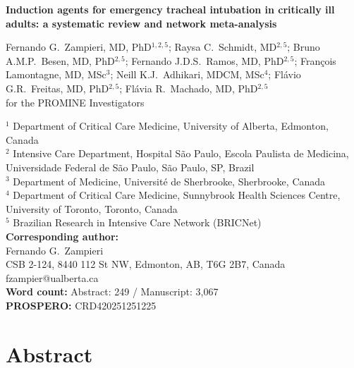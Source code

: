 \documentclass[11pt]{article}
\begin{document}
\begin{titlepage}
\centering
\vspace*{2cm}
{\LARGE\bfseries Induction agents for emergency tracheal intubation in critically ill adults: a systematic review and network meta-analysis\par}
\vspace{1.5cm}
{\large
Fernando G.\ Zampieri, MD, PhD$^{1,2,5}$;
Raysa C.\ Schmidt, MD$^{2,5}$;
Bruno A.M.P.\ Besen, MD, PhD$^{2,5}$;
Fernando J.D.S.\ Ramos, MD, PhD$^{2,5}$;
Fran\c{c}ois Lamontagne, MD, MSc$^{3}$;
Neill K.J.\ Adhikari, MDCM, MSc$^{4}$;
Fl\'avio G.R.\ Freitas, MD, PhD$^{2,5}$;
Fl\'avia R.\ Machado, MD, PhD$^{2,5}$\\[0.3cm]
for the PROMINE Investigators
\par}
\vspace{1.5cm}
{\normalsize
$^{1}$ Department of Critical Care Medicine, University of Alberta, Edmonton, Canada\\
$^{2}$ Intensive Care Department, Hospital S\~ao Paulo, Escola Paulista de Medicina, Universidade Federal de S\~ao Paulo, S\~ao Paulo, SP, Brazil\\
$^{3}$ Department of Medicine, Universit\'e de Sherbrooke, Sherbrooke, Canada\\
$^{4}$ Department of Critical Care Medicine, Sunnybrook Health Sciences Centre, University of Toronto, Toronto, Canada\\
$^{5}$ Brazilian Research in Intensive Care Network (BRICNet)\\
\vspace{1cm}
\textbf{Corresponding author:}\\
Fernando G.\ Zampieri\\
CSB 2-124, 8440 112 St NW, Edmonton, AB, T6G 2B7, Canada\\
fzampier@ualberta.ca\\
\vspace{1cm}
\textbf{Word count:} Abstract: 249 / Manuscript: 3,067\\
\textbf{PROSPERO:} CRD420251251225\\
}
\end{titlepage}

\section*{Abstract}
\end{document}
